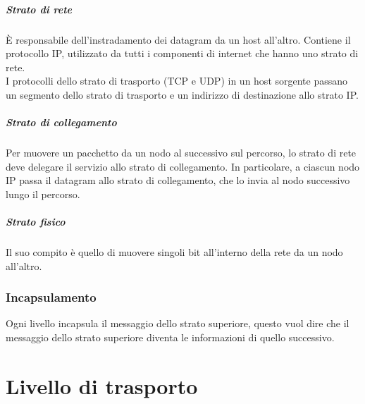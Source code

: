 \documentclass[11pt,a4paper]{book}
\begin{document}
\paragraph{Strato di rete}
È responsabile dell'instradamento dei datagram da un host all'altro. Contiene il protocollo IP, utilizzato da tutti i componenti di internet che hanno uno strato di rete. \\
I protocolli dello strato di trasporto (TCP e UDP) in un host sorgente passano un segmento dello strato di trasporto e un indirizzo di destinazione allo strato IP.
\paragraph{Strato di collegamento}
Per muovere un pacchetto da un nodo al successivo sul percorso, lo strato di rete deve delegare il servizio allo strato di collegamento. In particolare, a ciascun nodo IP passa il datagram allo strato di collegamento, che lo invia al nodo successivo lungo il percorso.
\paragraph{Strato fisico}
Il suo compito è quello di muovere singoli bit all'interno della rete da un nodo all'altro.

\subsection{Incapsulamento}
Ogni livello incapsula il messaggio dello strato superiore, questo vuol dire che il messaggio dello strato superiore diventa le informazioni di quello successivo.
\pagebreak

\chapter{Livello di trasporto}
\end{document}
